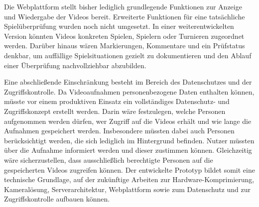 Die Webplattform stellt bisher lediglich grundlegende Funktionen zur Anzeige und Wiedergabe der Videos bereit. Erweiterte Funktionen für eine tatsächliche Spielüberprüfung wurden noch nicht umgesetzt. In einer weiterentwickelten Version könnten Videos konkreten Spielen, Spielern oder Turnieren zugeordnet werden. 
Darüber hinaus wären Markierungen, Kommentare und ein Prüfstatus denkbar, um auffällige Spielsituationen gezielt zu dokumentieren und den Ablauf einer Überprüfung nachvollziehbar abzubilden. 

Eine abschließende Einschränkung besteht im Bereich des Datenschutzes und der Zugriffskontrolle. Da Videoaufnahmen personenbezogene Daten enthalten können, müsste vor einem produktiven Einsatz ein vollständiges Datenschutz- und Zugriffskonzept erstellt werden. Darin wäre festzulegen, welche Personen aufgenommen werden dürfen, 
wer Zugriff auf die Videos erhält und wie lange die Aufnahmen gespeichert werden. Insbesondere müssten dabei auch Personen berücksichtigt werden, die sich lediglich im Hintergrund befinden. Nutzer müssten über die Aufnahme informiert werden und dieser zustimmen können. Gleichzeitig wäre sicherzustellen, 
dass ausschließlich berechtigte Personen auf die gespeicherten Videos zugreifen können. Der entwickelte Prototyp bildet somit eine technische Grundlage, auf der zukünftige Arbeiten zur Hardware-Komprimierung, Kameralösung, Serverarchitektur, Webplattform sowie zum Datenschutz und zur Zugriffskontrolle aufbauen können.